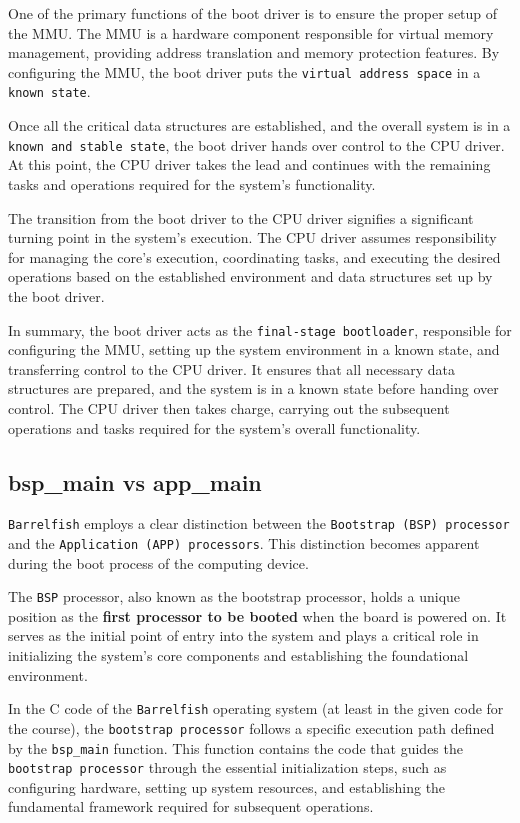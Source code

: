 One of the primary functions of the boot driver is to ensure the proper setup of the MMU. The MMU is a hardware component responsible for virtual memory management, providing address translation and memory protection features. By configuring the MMU, the boot driver puts the \texttt{virtual address space} in a \texttt{known state}.

Once all the critical data structures are established, and the overall system is in a \texttt{known and stable state}, the boot driver hands over control to the CPU driver. At this point, the CPU driver takes the lead and continues with the remaining tasks and operations required for the system's functionality.

The transition from the boot driver to the CPU driver signifies a significant turning point in the system's execution. The CPU driver assumes responsibility for managing the core's execution, coordinating tasks, and executing the desired operations based on the established environment and data structures set up by the boot driver.

In summary, the boot driver acts as the \texttt{final-stage bootloader}, responsible for configuring the MMU, setting up the system environment in a known state, and transferring control to the CPU driver. It ensures that all necessary data structures are prepared, and the system is in a known state before handing over control. The CPU driver then takes charge, carrying out the subsequent operations and tasks required for the system's overall functionality.

\subsection{bsp\_main vs app\_main}

\texttt{Barrelfish} employs a clear distinction between the \texttt{Bootstrap (BSP) processor} and the \texttt{Application (APP) processors}. This distinction becomes apparent during the boot process of the computing device.

The \texttt{BSP} processor, also known as the bootstrap processor, holds a unique position as the \textbf{first processor to be booted} when the board is powered on. It serves as the initial point of entry into the system and plays a critical role in initializing the system's core components and establishing the foundational environment.

In the C code of the \texttt{Barrelfish} operating system (at least in the given code for the course), the \texttt{bootstrap processor} follows a specific execution path defined by the \texttt{bsp\_main} function. This function contains the code that guides the \texttt{bootstrap processor} through the essential initialization steps, such as configuring hardware, setting up system resources, and establishing the fundamental framework required for subsequent operations.


